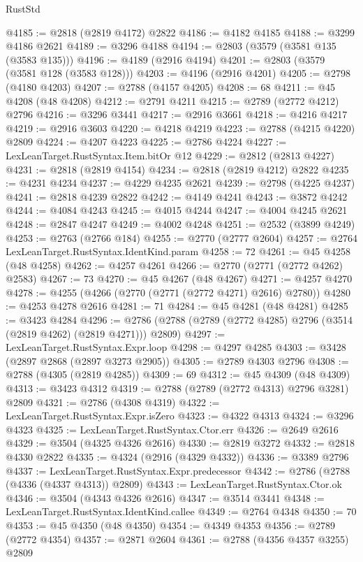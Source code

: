 \begin{lexlean}{RustStd}
\begin{coremodule}
@4185 := @2818 (@2819 @4172) @2822
@4186 := @4182 @4185
@4188 := @3299 @4186 @2621
@4189 := @3296 @4188
@4194 := @2803 (@3579 (@3581 @135 (@3583 @135)))
@4196 := @4189 (@2916 @4194)
@4201 := @2803 (@3579 (@3581 @128 (@3583 @128)))
@4203 := @4196 (@2916 @4201)
@4205 := @2798 (@4180 @4203)
@4207 := @2788 (@4157 @4205)
@4208 := 68
@4211 := @45 @4208 (@48 @4208)
@4212 := @2791 @4211
@4215 := @2789 (@2772 @4212) @2796
@4216 := @3296 @3441
@4217 := @2916 @3661
@4218 := @4216 @4217
@4219 := @2916 @3603
@4220 := @4218 @4219
@4223 := @2788 (@4215 @4220) @2809
@4224 := @4207 @4223
@4225 := @2786 @4224
@4227 := LexLeanTarget.RustSyntax.Item.bitOr @12
@4229 := @2812 (@2813 @4227)
@4231 := @2818 (@2819 @4154)
@4234 := @2818 (@2819 @4212) @2822
@4235 := @4231 @4234
@4237 := @4229 @4235 @2621
@4239 := @2798 (@4225 @4237)
@4241 := @2818 @4239 @2822
@4242 := @4149 @4241
@4243 := @3872 @4242
@4244 := @4084 @4243
@4245 := @4015 @4244
@4247 := @4004 @4245 @2621
@4248 := @2847 @4247
@4249 := @4002 @4248
@4251 := @2532 (@3899 @4249)
@4253 := @2763 (@2766 @184)
@4255 := @2770 (@2777 @2604)
@4257 := @2764 LexLeanTarget.RustSyntax.IdentKind.param
@4258 := 72
@4261 := @45 @4258 (@48 @4258)
@4262 := @4257 @4261
@4266 := @2770 (@2771 (@2772 @4262) @2583)
@4267 := 73
@4270 := @45 @4267 (@48 @4267)
@4271 := @4257 @4270
@4278 := @4255 (@4266 (@2770 (@2771 (@2772 @4271) @2616) @2780))
@4280 := @4253 @4278 @2616
@4281 := 71
@4284 := @45 @4281 (@48 @4281)
@4285 := @3423 @4284
@4296 := @2786 (@2788 (@2789 (@2772 @4285) @2796 (@3514 (@2819 @4262) (@2819 @4271))) @2809)
@4297 := LexLeanTarget.RustSyntax.Expr.loop
@4298 := @4297 @4285
@4303 := @3428 (@2897 @2868 (@2897 @3273 @2905))
@4305 := @2789 @4303 @2796
@4308 := @2788 (@4305 (@2819 @4285))
@4309 := 69
@4312 := @45 @4309 (@48 @4309)
@4313 := @3423 @4312
@4319 := @2788 (@2789 (@2772 @4313) @2796 @3281) @2809
@4321 := @2786 (@4308 @4319)
@4322 := LexLeanTarget.RustSyntax.Expr.isZero
@4323 := @4322 @4313
@4324 := @3296 @4323
@4325 := LexLeanTarget.RustSyntax.Ctor.err
@4326 := @2649 @2616
@4329 := @3504 (@4325 @4326 @2616)
@4330 := @2819 @3272
@4332 := @2818 @4330 @2822
@4335 := @4324 (@2916 (@4329 @4332))
@4336 := @3389 @2796
@4337 := LexLeanTarget.RustSyntax.Expr.predecessor
@4342 := @2786 (@2788 (@4336 (@4337 @4313)) @2809)
@4343 := LexLeanTarget.RustSyntax.Ctor.ok
@4346 := @3504 (@4343 @4326 @2616)
@4347 := @3514 @3441
@4348 := LexLeanTarget.RustSyntax.IdentKind.callee
@4349 := @2764 @4348
@4350 := 70
@4353 := @45 @4350 (@48 @4350)
@4354 := @4349 @4353
@4356 := @2789 (@2772 @4354)
@4357 := @2871 @2604
@4361 := @2788 (@4356 @4357 @3255) @2809

\end{coremodule}
\end{lexlean}

